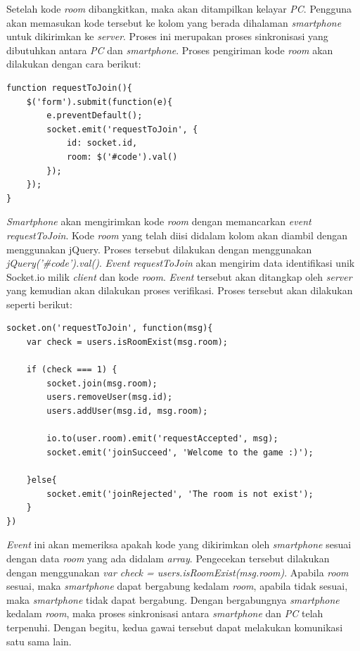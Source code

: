 \begin{enumerate}
\begin{itemize}
		Setelah kode \textit{room} dibangkitkan, maka akan ditampilkan kelayar \textit{PC}. Pengguna akan memasukan kode tersebut ke kolom yang berada dihalaman \textit{smartphone} untuk dikirimkan ke \textit{server}. Proses ini merupakan proses sinkronisasi yang dibutuhkan antara \textit{PC} dan \textit{smartphone}. Proses pengiriman kode \textit{room} akan dilakukan dengan cara berikut:
\begin{lstlisting}[caption={proses permintaan bergabung pada \textit{client}}, label={lst:client_req}, captionpos=b]
function requestToJoin(){
	$('form').submit(function(e){
		e.preventDefault();
		socket.emit('requestToJoin', {
			id: socket.id,
			room: $('#code').val()
		});
	});
}
\end{lstlisting}
		\textit{Smartphone} akan mengirimkan kode \textit{room} dengan memancarkan \textit{event requestToJoin}. Kode \textit{room} yang telah diisi didalam kolom akan diambil dengan menggunakan jQuery. Proses tersebut dilakukan dengan menggunakan \textit{jQuery('\#code').val()}. \textit{Event requestToJoin} akan mengirim data identifikasi unik Socket.io milik \textit{client} dan kode \textit{room}. \textit{Event} tersebut akan ditangkap oleh \textit{server} yang kemudian akan dilakukan proses verifikasi. Proses tersebut akan dilakukan seperti berikut:
\begin{lstlisting}[caption={Proses verifikasi}, label={lst:prosesVerifikasi},captionpos=b]
socket.on('requestToJoin', function(msg){
	var check = users.isRoomExist(msg.room);

	if (check === 1) {
		socket.join(msg.room);
		users.removeUser(msg.id);
		users.addUser(msg.id, msg.room);

		io.to(user.room).emit('requestAccepted', msg);
		socket.emit('joinSucceed', 'Welcome to the game :)');

	}else{
		socket.emit('joinRejected', 'The room is not exist');
	}
})
\end{lstlisting}
		\textit{Event} ini akan memeriksa apakah kode yang dikirimkan oleh \textit{smartphone} sesuai dengan data \textit{room} yang ada didalam \textit{array}. Pengecekan tersebut dilakukan dengan menggunakan \textit{var check = users.isRoomExist(msg.room)}. Apabila \textit{room} sesuai, maka \textit{smartphone} dapat bergabung kedalam \textit{room}, apabila tidak sesuai, maka \textit{smartphone} tidak dapat bergabung. Dengan bergabungnya \textit{smartphone} kedalam \textit{room}, maka proses sinkronisasi antara \textit{smartphone} dan \textit{PC} telah terpenuhi. Dengan begitu, kedua gawai tersebut dapat melakukan komunikasi satu sama lain.
		
	\end{itemize}
\end{enumerate}

